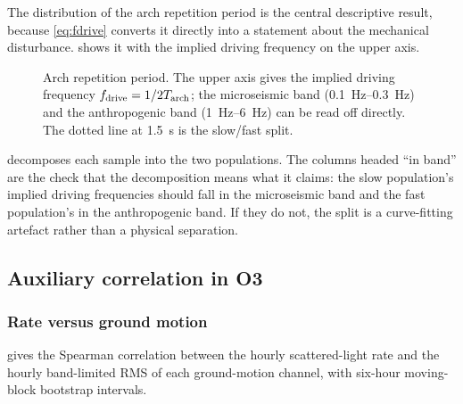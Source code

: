 The distribution of the arch repetition period is the central descriptive
result, because \cref{eq:fdrive} converts it directly into a statement about
the mechanical disturbance.  shows it with the implied
driving frequency on the upper axis.

\begin{figure}[htbp]
\centering
{}
\caption{Arch repetition period. The upper axis gives the implied driving
frequency $f_{\mathrm{drive}} = 1/2T_{\mathrm{arch}}$; the microseismic band
(\SIrange{0.1}{0.3}{\hertz}) and the anthropogenic band
(\SIrange{1}{6}{\hertz}) can be read off directly. The dotted line at
\SI{1.5}{\second} is the slow/fast split.}
\label{fig:archperiod}
\end{figure}

 decomposes each sample into the two populations. The
columns headed ``in band'' are the check that the decomposition means what it
claims: the slow population's implied driving frequencies should fall in the
microseismic band and the fast population's in the anthropogenic band. If they
do not, the split is a curve-fitting artefact rather than a physical
separation.

\begin{table}[htbp]
\centering
\caption{Slow/fast decomposition. ``In band'' is the fraction of each
population whose implied driving frequency falls in the corresponding
ground-motion band.}
\label{tab:slowfast}
\small
{}
\end{table}

\subsection{Auxiliary correlation in O3}
\label{sec:results:aux}

\subsubsection{Rate versus ground motion}

 gives the Spearman correlation between the hourly
scattered-light rate and the hourly band-limited RMS of each ground-motion
channel, with six-hour moving-block bootstrap intervals.

\begin{table}[htbp]
\centering
\caption{Rank correlation of the hourly scattered-light rate with
ground-motion band-limited RMS, \Lone{} \Otzb. Channel names are abbreviated:
each is prefixed  and suffixed . Intervals
are \SI{95}{\percent} moving-block bootstrap. Full table in
.}
\label{tab:ratecorr}
\footnotesize
{}
\end{table}

